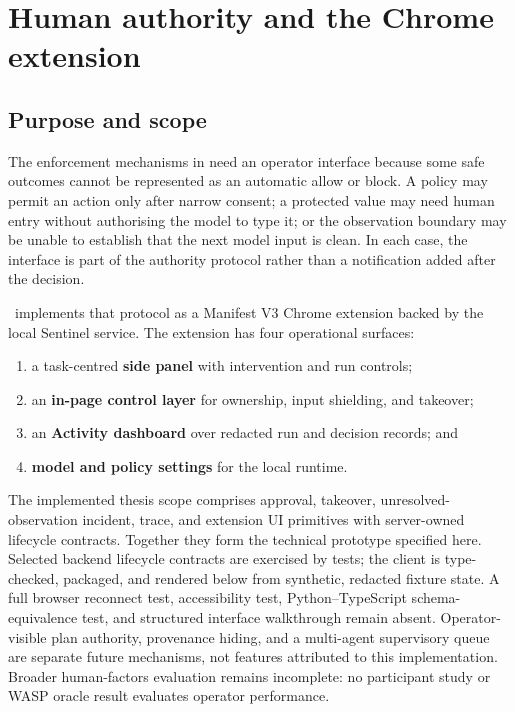 \chapter{Human authority and the Chrome extension}
\label{chap:governance-interface}

\section{Purpose and scope}

The enforcement mechanisms in  need an operator interface
because some safe outcomes cannot be represented as an automatic allow or
block. A policy may permit an action only after narrow consent; a protected
value may need human entry without authorising the model to type it; or the
observation boundary may be unable to establish that the next model input is
clean. In each case, the interface is part of the authority protocol rather
than a notification added after the decision.

\systemname\ implements that protocol as a Manifest V3 Chrome extension backed
by the local Sentinel service. The extension has four operational surfaces:

\begin{enumerate}
  \item a task-centred \textbf{side panel} with intervention and run controls;
  \item an \textbf{in-page control layer} for ownership, input shielding, and
  takeover;
  \item an \textbf{Activity dashboard} over redacted run and decision records;
  and \item \textbf{model and policy settings} for the local runtime.
\end{enumerate}

The implemented thesis scope comprises approval, takeover,
unresolved-observation incident, trace, and extension UI primitives with
server-owned lifecycle contracts. Together they form the technical prototype
specified here. Selected backend lifecycle contracts are exercised by tests;
the client is type-checked, packaged, and rendered below from synthetic,
redacted fixture state. A full browser reconnect test, accessibility test,
Python--TypeScript schema-equivalence test, and structured interface walkthrough
remain absent.
Operator-visible plan authority, provenance hiding, and a multi-agent
supervisory queue are separate future mechanisms, not features attributed to
this implementation. Broader human-factors evaluation remains incomplete: no
participant study or WASP oracle result evaluates operator performance.

